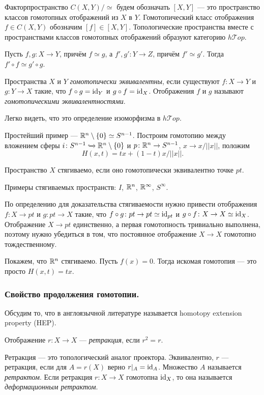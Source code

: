 Факторпространство $C(X,Y)/\simeq$ будем обозначать $[X,Y]$ --- это пространство классов гомотопных отображений из $X$ в $Y$. Гомотопический класс отображения $f\in C(X,Y)$ обозначим $[f]\in[X,Y]$. Топологические пространства вместе с пространствами классов гомотопных отображений образуют категорию $h\mathcal{T}op$.

\begin{prop}
	Пусть $f,g\colon X\to Y$, причём $f\simeq g$, а $f',g'\colon Y\to Z$, причём $f'\simeq g'$. Тогда $f'\circ f\simeq g'\circ g$.
\end{prop}

\begin{defin}
	Пространства $X$ и $Y$ \textit{гомотопически эквивалентны}, если существуют $f\colon X\to Y$ и $g\colon Y\to X$ такие, что $f\circ g=\text{id}_Y$ и $g\circ f=\text{id}_X$. Отображения $f$ и $g$ называют \textit{гомотопическими эквивалентностями}.
\end{defin}
Легко видеть, что это определение изоморфизма в $h\mathcal{T}op$.

Простейший пример --- $\mathbb {R}^n\setminus\{0\}\simeq S^{n-1}$. Построим гомотопию между вложением сферы $i\colon S^{n-1}\xhookrightarrow{}\mathbb {R}^n\setminus\{0\}$ и $p\colon\mathbb {R}^n\to S^{n-1}$, $x\to x/||x||$, положим
	\begin{equation*}
		H(x,t)=tx+(1-t)x/||x||.
	\end{equation*}
\begin{defin}
	Пространство $X$ стягиваемо, если оно гомотопически эквивалентно точке $pt$.
\end{defin}
Примеры стягиваемых пространств: $I$, $\mathbb {R}^n$, $\mathbb {R}^{\infty}$, $S^{\infty}$.

По определению для доказательства стягиваемости нужно привести отображения $f\colon X\to pt$ и $g\colon pt\to X$ такие, что $f\circ g\colon pt\to pt\simeq\text{id}_{pt}$ и $g\circ f\colon X\to X\simeq\text{id}_X$. Отображение $X\to pt$ единственно, а первая гомотопность тривиально выполнена, поэтому нужно убедиться в том, что постоянное отображение $X\to X$ гомотопно тождественному.

Покажем, что $\mathbb {R}^n$ стягиваемо. Пусть $f(x)=0$. Тогда искомая гомотопия --- это просто $H(x,t)=tx$.

\subsubsection{Свойство продолжения гомотопии.} Обсудим то, что в англоязычной литературе называется homotopy extension property (HEP).
\begin{defin}
	Отображение $r\colon X\to X$ --- \textit{ретракция}, если $r^2=r$.
\end{defin}
Ретракция --- это топологический аналог проектора. Эквивалентно, $r$ --- ретракция, если для $A=r(X)$ верно $r|_A=\text{id}_A$. Множество $A$ называется \textit{ретрактом}. Если ретракция $r\colon X\to X$ гомотопна $\text{id}_X$, то она называется \textit{деформационным ретрактом}.

